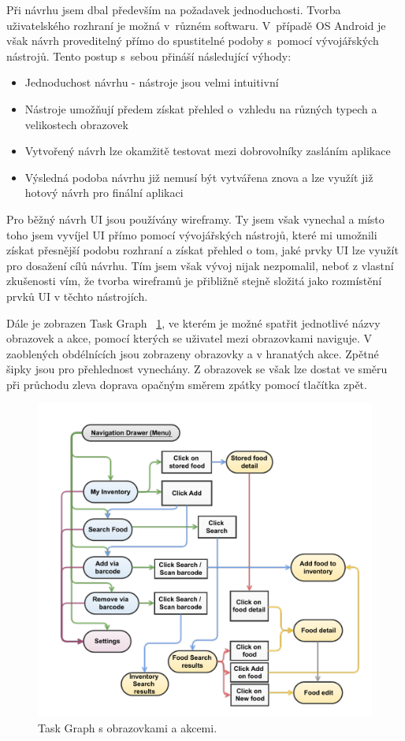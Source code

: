 \documentclass[thesis=B,czech]{FITthesis}[2013/10/20]
\begin{document}
Při návrhu jsem dbal především na požadavek jednoduchosti. Tvorba uživatelského rozhraní je možná v~různém softwaru. V~případě OS Android je však návrh proveditelný přímo do spustitelné podoby s~pomocí vývojářských nástrojů. Tento postup s~sebou přináší následující výhody:

\begin{itemize}
  \item{Jednoduchost návrhu - nástroje jsou velmi intuitivní}
  \item{Nástroje umožňují předem získat přehled o~vzhledu na různých typech a velikostech obrazovek}
  \item{Vytvořený návrh lze okamžitě testovat mezi dobrovolníky zasláním aplikace}
  \item{Výsledná podoba návrhu již nemusí být vytvářena znova a lze využít již hotový návrh pro finální aplikaci}
\end{itemize}

Pro běžný návrh UI jsou používány wireframy. Ty jsem však vynechal a místo toho jsem vyvíjel UI přímo pomocí vývojářských nástrojů, které mi umožnili získat přesnější podobu rozhraní a získat přehled o tom, jaké prvky UI lze využít pro dosažení cílů návrhu. Tím jsem však vývoj nijak nezpomalil, neboť z vlastní zkušenosti vím, že tvorba wireframů je přibližně stejně složitá jako rozmístění prvků UI v těchto nástrojích.

Dále je zobrazen Task Graph ~\ref{fig:TaskGraph}, ve kterém je možné spatřit jednotlivé názvy obrazovek a akce, pomocí kterých se uživatel mezi obrazovkami naviguje. V zaoblených obdélnících jsou zobrazeny obrazovky a v hranatých akce. Zpětné šipky jsou pro přehlednost vynechány. Z obrazovek se však lze dostat ve směru při průchodu zleva doprava opačným směrem zpátky pomocí tlačítka zpět.

\begin{figure}[H]
  \centering
  \includegraphics[scale=0.70]{diagrams/ui.pdf}
  \caption{Task Graph s obrazovkami a akcemi.}
  \label{fig:TaskGraph}
\end{figure}
\end{document}

